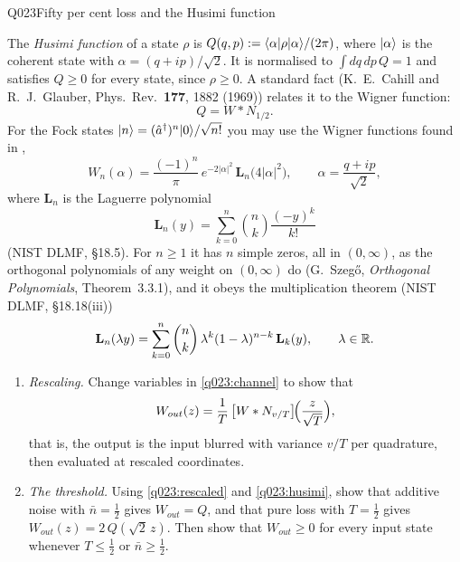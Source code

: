 \begin{entry}{Q023}{Fifty per cent loss and the Husimi function}
\begin{problem}
The \emph{Husimi function} of a state $\rho$ is
$Q(q,p):=\langle \alpha \rvert\rho\lvert \alpha \rangle/(2\pi)$, where $\lvert \alpha \rangle$ is the coherent state
with $\alpha=(q+ip)/\sqrt2$. It is normalised to $\int dq\,dp\,Q=1$ and satisfies $Q\ge0$
for every state, since $\rho\ge0$. A standard fact (K.~E.~Cahill and R.~J.~Glauber,
Phys.~Rev.\ \textbf{177}, 1882 (1969)) relates it to the Wigner function:
\begin{equation}
  Q=W*N_{1/2}.
  \label{q023:husimi}
\end{equation}
For the Fock states $\lvert n \rangle=(\hat a^{\dagger})^{n}\lvert 0 \rangle/\sqrt{n!}$ you may use the Wigner
functions found in ,
\begin{equation}
  W_{n}(\alpha)=\frac{(-1)^{n}}{\pi}\,e^{-2|\alpha|^{2}}\,\mathbf L_{n}\bigl(4|\alpha|^{2}\bigr),
  \qquad \alpha=\frac{q+ip}{\sqrt2},
  \label{q023:fock}
\end{equation}
where $\mathbf L_n$ is the Laguerre polynomial
\begin{equation}
  \mathbf L_{n}(y)=\sum_{k=0}^{n}\binom nk\frac{(-y)^{k}}{k!}
  \label{q023:laguerre-sum}
\end{equation}
(NIST DLMF, \S18.5). For $n\ge1$ it has $n$ simple zeros, all in $(0,\infty)$, as the
orthogonal polynomials of any weight on $(0,\infty)$ do (G.~Szeg\H{o}, \emph{Orthogonal
Polynomials}, Theorem~3.3.1), and it obeys the multiplication theorem (NIST DLMF,
\S18.18(iii))
\begin{equation}
  \mathbf L_{n}(\lambda y)=\sum_{k=0}^{n}\binom nk\,\lambda^{k}(1-\lambda)^{n-k}\,
  \mathbf L_{k}(y),\qquad \lambda\in\mathbb{R} .
  \label{q023:multiplication}
\end{equation}

\begin{enumerate}[label=\textbf{(\alph*)},leftmargin=*]
  \item \emph{Rescaling.} Change variables in \eqref{q023:channel} to show that
        \begin{equation}
          W_{out}(z)=\frac1T\,\bigl[W*N_{v/T}\bigr]\!\Bigl(\frac{z}{\sqrt T}\Bigr),
          \label{q023:rescaled}
        \end{equation}
        that is, the output is the input blurred with variance $v/T$ per quadrature,
        then evaluated at rescaled coordinates.

  \item \emph{The threshold.} Using \eqref{q023:rescaled} and \eqref{q023:husimi}, show
        that additive noise with $\bar n=\tfrac12$ gives $W_{out}=Q$, and that pure loss
        with $T=\tfrac12$ gives $W_{ out}(z)=2\,Q(\sqrt2\,z)$. Then show that
        $W_{out}\ge0$ for every input state whenever $T\le\tfrac12$ or
        $\bar n\ge\tfrac12$. 


\end{enumerate}
\end{problem}
\end{entry}
